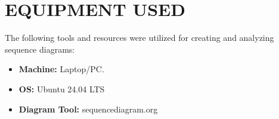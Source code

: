 \chapter{EQUIPMENT USED}
\label{ch:eqp_used}

The following tools and resources were utilized for creating and analyzing sequence diagrams:

\begin{itemize}
    \item \textbf{Machine:} Laptop/PC.
    \item \textbf{OS:} Ubuntu 24.04 LTS
    \item \textbf{Diagram Tool:} sequencediagram.org
\end{itemize}

\clearpage




